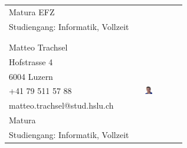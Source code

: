 \begin{tabular}{lp{3.3cm}l}
    Matura EFZ                    			    & &  \\
    Studiengang: Informatik, Vollzeit           & &  \\
                                                & &  \\
                                                & &  \\
    Matteo Trachsel                             & &  \multirow{8}{4cm}{\includegraphics[width=0.2\textwidth]{Sourcen/DasTeam/Bilder/MatteoTrachsel.jpg}} \\
    Hofstrasse 4                                & &  \\
    6004 Luzern                                 & &  \\
    +41 79 511 57 88                            & &  \\
    matteo.trachsel@stud.hslu.ch                & &  \\
    Matura                                      & &  \\
    Studiengang: Informatik, Vollzeit           & &  \\
\end{tabular}
    
